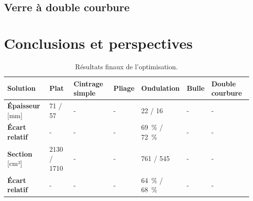 \documentclass[11pt,titlepage]{article}
\begin{document}
\newpage
\subsection{Verre à double courbure}

\newpage

\section{Conclusions et perspectives}

\begin{table}[H]
    \centering
    \caption{Résultats finaux de l'optimisation.}
    \label{tab:result_fin}
    \begin{tabularx}{\textwidth}{l*{6}{Y}}
    \toprule
    \textbf{Solution} & \textbf{Plat}& \textbf{Cintrage simple} &\textbf{Pliage} & \textbf{Ondulation}& \textbf{Bulle}& \textbf{Double courbure} \\\midrule
    \textbf{Épaisseur} [mm]& 71 / 57 & - & - & 22 / 16 & - & - \\
    \textbf{Écart relatif} & - & - & - & \qty{69}{\percent} / \qty{72}{\percent} & - & - \\
    \textbf{Section} [cm²] & 2130 / 1710 & - & - & 761 / 545 & - & - \\
    \textbf{Écart relatif} & - & - & - & \qty{64}{\percent} / \qty{68}{\percent} & - & - \\
    \bottomrule
    \end{tabularx}
    \end{table}
\newpage

\printbibliography
\end{document}
